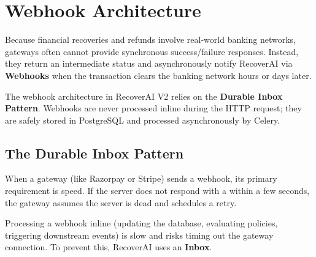 
\section{Webhook Architecture}

\begin{tcolorbox}[summarybox={\iconFlow[1.5] Asynchronous Event Ingestion}]
\color{textdark}
Because financial recoveries and refunds involve real-world banking networks, gateways often cannot provide synchronous success/failure responses. Instead, they return an intermediate status and asynchronously notify RecoverAI via \textbf{Webhooks} when the transaction clears the banking network hours or days later.

The webhook architecture in RecoverAI V2 relies on the \textbf{Durable Inbox Pattern}. Webhooks are never processed inline during the HTTP request; they are safely stored in PostgreSQL and processed asynchronously by Celery.
\end{tcolorbox}

\vspace{0.8cm}

\subsection{The Durable Inbox Pattern}

When a gateway (like Razorpay or Stripe) sends a webhook, its primary requirement is speed. If the server does not respond with a  within a few seconds, the gateway assumes the server is dead and schedules a retry. 

Processing a webhook inline (updating the database, evaluating policies, triggering downstream events) is slow and risks timing out the gateway connection. To prevent this, RecoverAI uses an \textbf{Inbox}.

